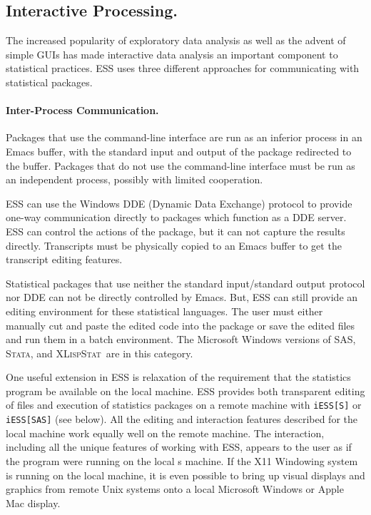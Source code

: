 \documentclass{article}
\newcommand*{\SAS}{\textsc{SAS}}
\newcommand*{\XLispStat}{\textsc{XLispStat}}
\newcommand*{\Stata}{\textsc{Stata}}
\newcommand{\stexttt}[1]{{\small\texttt{#1}}}
\begin{document}
\subsection{Interactive Processing.}
\label{sec:interactive}

The increased popularity of exploratory data analysis as well as the
advent of simple GUIs has made interactive data analysis an important
component to statistical practices.  
ESS uses three different approaches for communicating with statistical
packages.

\paragraph{Inter-Process Communication.}
Packages that use the command-line interface are run as an inferior
process in an Emacs buffer, with the standard input and output of the
package redirected to the buffer.  Packages that do not use the
command-line interface must be run as an independent process, possibly
with limited cooperation.

ESS can use the Windows DDE (Dynamic Data Exchange) protocol to
provide one-way communication directly to packages which function as a
DDE server.  ESS can control the actions of the package, but it can not capture
the results directly.  Transcripts must be physically copied to an
Emacs buffer to get the transcript editing features.

Statistical packages that use neither the standard input/standard
output protocol nor DDE can not be directly controlled by Emacs.  But, ESS
can still provide an editing environment for these statistical languages.  The
user must either manually cut and paste the edited code into the
package or save the edited files and run them in a batch environment.
The Microsoft Windows versions of \SAS, \Stata, and \XLispStat\ are
in this category.

One useful extension in ESS is relaxation of the requirement that the
statistics program be available on the local machine.  ESS provides
both transparent editing of files and execution of statistics packages
on a remote machine with \stexttt{iESS[S]} or \stexttt{iESS[SAS]} (see
below).  All the editing and interaction features described for the
local machine work equally well on the remote machine.  The
interaction, including all the unique features of working with ESS,
appears to the user as if the program were running on the local
s%
machine.  If the X11 Windowing system is running on the local machine,
it is even possible to bring up visual displays and graphics from
remote Unix systems onto a local Microsoft Windows or Apple Mac
display.
\end{document}
